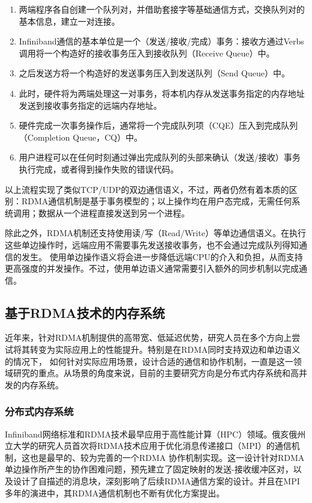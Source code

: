 \begin{enumerate}
	\item 两端程序各自创建一个队列对，并借助套接字等基础通信方式，交换队列对的基本信息，建立一对连接。
	\item Infiniband通信的基本单位是一个（发送/接收/完成）事务：接收方通过Verbs调用将一个构造好的接收事务压入到接收队列（Receive Queue）中。
	\item 之后发送方将一个构造好的发送事务压入到发送队列（Send Queue）中。
	\item 此时，硬件将为两端处理这一对事务，将本机内存从发送事务指定的内存地址发送到接收事务指定的远端内存地址。
	\item 硬件完成一次事务操作后，通常将一个完成队列项（CQE）压入到完成队列（Completion Queue，CQ）中。
	\item 用户进程可以在任何时刻通过弹出完成队列的头部来确认（发送/接收）事务执行完成，或者得到操作失败的错误代码。
\end{enumerate}

以上流程实现了类似TCP/UDP的双边通信语义，不过，两者仍然有着本质的区别：RDMA通信机制是基于事务模型的；以上操作均在用户态完成，无需任何系统调用；数据从一个进程直接发送到另一个进程。

除此之外，RDMA机制还支持使用读/写（Read/Write）等单边通信语义。在执行这些单边操作时，远端应用不需要事先发送接收事务，也不会通过完成队列得知通信的发生。
使用单边操作语义将会进一步降低远端CPU的介入和负担，从而支持更高强度的并发操作。不过，使用单边语义通常需要引入额外的同步机制以完成通信。

\subsection{基于RDMA技术的内存系统}

近年来，针对RDMA机制提供的高带宽、低延迟优势，研究人员在多个方向上尝试将其转变为实际应用上的性能提升。特别是在RDMA同时支持双边和单边语义的情况下，
如何针对实际应用场景，设计合适的通信和协作机制，一直是这一领域研究的重点。从场景的角度来说，目前的主要研究方向是分布式内存系统和高并发的内存系统。

\subsubsection{分布式内存系统}

Infiniband网络标准和RDMA技术最早应用于高性能计算（HPC）领域。俄亥俄州立大学的研究人员\cite{liu2004high}首次将RDMA技术应用于优化消息传递接口（MPI）的通信机制，这也是最早的、较为完善的一个RDMA
协作机制实现。这一设计针对RDMA单边操作所产生的协作困难问题，预先建立了固定映射的发送-接收缓冲区对，以及设计了自描述的消息块，深刻影响了后续RDMA通信方案的设计\cite{mitchell2013using}\cite{kalia2014using}\cite{su2017rfp}。并且在MPI
多年的演进中，其RDMA通信机制也不断有优化方案提出\cite{sur2006rdma}\cite{wang2013gpu}。

